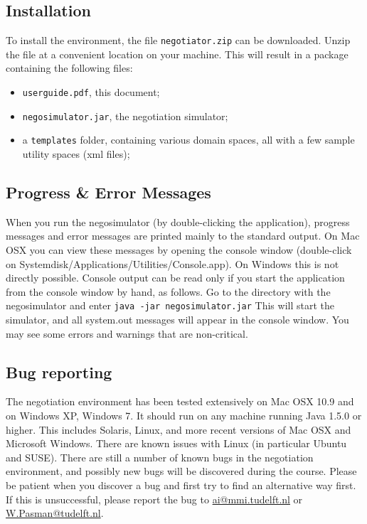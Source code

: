 \documentclass[]{article}
\newcommand\AI[1]{{}} \newcommand\ANAC[1]{{#1}}
\begin{document}
\subsection{Installation}
To install the environment, the file \texttt{negotiator.zip} can be downloaded. Unzip the file at a convenient location on your machine. This will result in a package containing the following files:

\begin{itemize}
	\AI{\item \texttt{assignment.pdf}, containing the assignment;}
	\item \texttt{userguide.pdf}, this document;
	\item \texttt{negosimulator.jar}, the negotiation simulator;
	\item a \texttt{templates} folder, containing various domain spaces, all with a few sample utility spaces (xml files);
	\AI{\item The \texttt{SimpleAgent.java} and \texttt{SimpleAgent.class} file.}
\end{itemize}

\subsection{Progress \& Error Messages}
When you run the negosimulator (by double-clicking the application), progress messages and error messages are printed mainly to the standard output. On Mac OSX you can view these messages by opening the console window (double-click on Systemdisk/Applications/Utilities/Console.app). On Windows this is not directly possible. Console output can be read only if you start the application from the console window by hand, as follows. Go to the directory with the negosimulator and enter
\texttt{java -jar negosimulator.jar}
This will start the simulator, and all system.out messages will appear in the console window. You may see some errors and warnings that are non-critical.

\subsection{Bug reporting}
The negotiation environment has been tested extensively on Mac OSX 10.9 and on Windows XP, Windows 7. It should run on any machine running Java 1.5.0 or higher. This includes Solaris, Linux, and more recent versions of Mac OSX and Microsoft Windows. There are known issues with Linux (in particular Ubuntu and SUSE). There are still a number of known bugs in the negotiation environment, and possibly new bugs will be discovered during the course. Please be patient when you discover a bug and first try to find an alternative way first. If this is unsuccessful, please report the bug to \url{ai@mmi.tudelft.nl} or \url{W.Pasman@tudelft.nl}.
 
\end{document}
